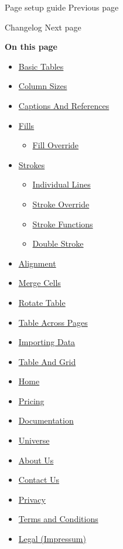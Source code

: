 { Page setup guide } { Previous page }

\href{/docs/changelog/}{\pandocbounded{}}

{ Changelog } { Next page }

\textbf{On this page}

\begin{itemize}
\tightlist
\item
  \hyperref[basic-tables]{Basic Tables}
\item
  \hyperref[column-sizes]{Column Sizes}
\item
  \hyperref[captions-and-references]{Captions And References}
\item
  \hyperref[fills]{Fills}

  \begin{itemize}
  \tightlist
  \item
    \hyperref[fill-override]{Fill Override}
  \end{itemize}
\item
  \hyperref[strokes]{Strokes}

  \begin{itemize}
  \tightlist
  \item
    \hyperref[individual-lines]{Individual Lines}
  \item
    \hyperref[stroke-override]{Stroke Override}
  \item
    \hyperref[stroke-functions]{Stroke Functions}
  \item
    \hyperref[double-stroke]{Double Stroke}
  \end{itemize}
\item
  \hyperref[alignment]{Alignment}
\item
  \hyperref[merge-cells]{Merge Cells}
\item
  \hyperref[rotate-table]{Rotate Table}
\item
  \hyperref[table-across-pages]{Table Across Pages}
\item
  \hyperref[importing-data]{Importing Data}
\item
  \hyperref[table-and-grid]{Table And Grid}
\end{itemize}

\begin{itemize}
\tightlist
\item
  \href{/}{Home}
\item
  \href{/pricing/}{Pricing}
\item
  \href{/docs/}{Documentation}
\item
  \href{/universe/}{Universe}
\item
  \href{/about/}{About Us}
\item
  \href{/contact/}{Contact Us}
\item
  \href{/privacy/}{Privacy}
\item
  \href{https://typst.app/terms}{Terms and Conditions}
\item
  \href{/legal/}{Legal (Impressum)}
\end{itemize}

